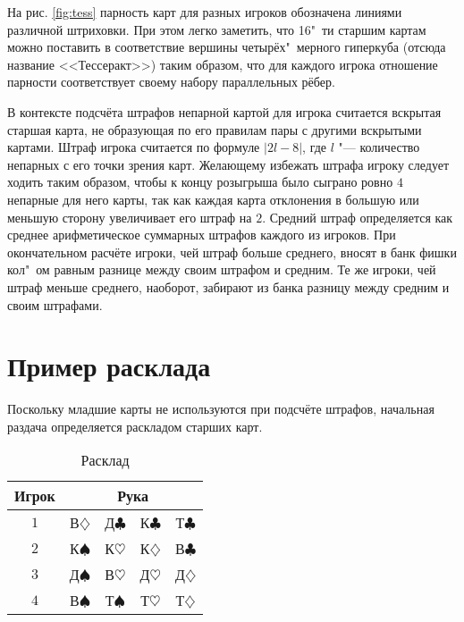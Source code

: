 На рис. \ref{fig:tess} парность карт для разных игроков обозначена линиями различной штриховки. При этом легко заметить, что 16"~ти старшим картам можно поставить в соответствие вершины четырёх"~мерного гиперкуба (отсюда название <<Тессеракт>>) таким образом, что для каждого игрока отношение парности соответствует своему набору параллельных рёбер.

В контексте подсчёта штрафов непарной картой для игрока считается вскрытая старшая карта, не образующая по его правилам пары с другими вскрытыми картами. Штраф игрока считается по формуле $\left|2l-8\right|$, где $l$ "--- количество непарных с его точки зрения карт. Желающему избежать штрафа игроку следует ходить таким образом, чтобы к концу розыгрыша было сыграно ровно $4$ непарные для него карты, так как каждая карта отклонения в большую или меньшую сторону увеличивает его штраф на $2$. Средний штраф определяется как среднее арифметическое суммарных штрафов каждого из игроков. При окончательном расчёте игроки, чей штраф больше среднего, вносят в банк фишки кол"~ом равным разнице между своим штрафом и средним. Те же игроки, чей штраф меньше среднего, наоборот, забирают из банка разницу между средним и своим штрафами.

\section{Пример расклада}\label{app:D2}

Поскольку младшие карты не используются при подсчёте штрафов, начальная раздача определяется раскладом старших карт.

\begin{table}[htbp]
	\centering
	\caption{Расклад}
	\label{tab:cards1}
	\begin{SingleSpace}
		\begin{tabular}{|c|cccc|}
			\hline
			Игрок & \multicolumn{4}{c|}{Рука} \\
			\hline
			$1$ & В$\diamondsuit$ & Д$\clubsuit$ & К$\clubsuit$ & Т$\clubsuit$ \\
			$2$ & К$\spadesuit$ & К$\heartsuit$ & К$\diamondsuit$ & В$\clubsuit$ \\
			$3$ & Д$\spadesuit$ & В$\heartsuit$ & Д$\heartsuit$ & Д$\diamondsuit$ \\
			$4$ & В$\spadesuit$ & Т$\spadesuit$ & Т$\heartsuit$ & Т$\diamondsuit$ \\
			\hline
		\end{tabular}
	\end{SingleSpace}
\end{table}

